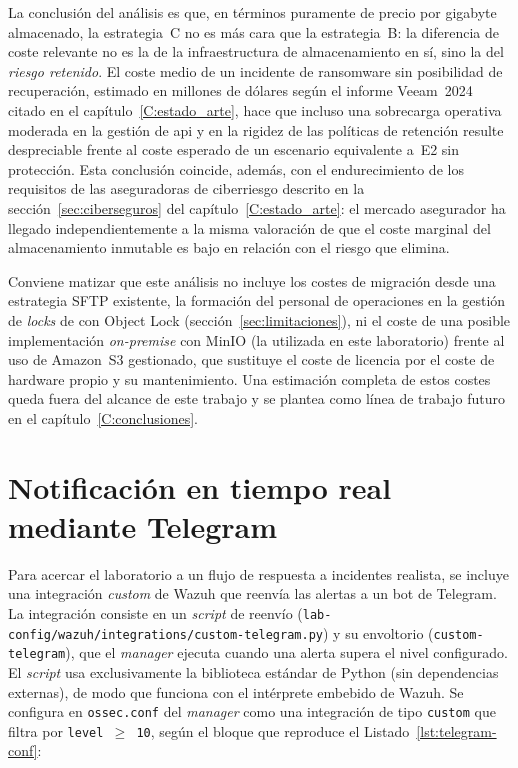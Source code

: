 \documentclass[../main.tex]{subfiles}
\begin{document}
La conclusión del análisis es que, en términos puramente de precio por gigabyte
almacenado, la estrategia~C no es más cara que la estrategia~B: la diferencia de
coste relevante no es la de la infraestructura de almacenamiento en sí, sino la
del \emph{riesgo retenido}. El coste medio de un incidente de ransomware sin
posibilidad de recuperación, estimado en millones de dólares según el informe
Veeam~2024~\cite{veeam2024} citado en el capítulo~\ref{C:estado_arte}, hace que
incluso una sobrecarga operativa moderada en la gestión de \gls{api} y en la
rigidez de las políticas de retención resulte despreciable frente al coste esperado
de un escenario equivalente a~E2 sin protección. Esta conclusión coincide, además,
con el endurecimiento de los requisitos de las aseguradoras de ciberriesgo descrito
en la sección~\ref{sec:ciberseguros} del capítulo~\ref{C:estado_arte}: el mercado
asegurador ha llegado independientemente a la misma valoración de que el coste
marginal del almacenamiento inmutable es bajo en relación con el riesgo que
elimina.

Conviene matizar que este análisis no incluye los costes de migración desde una
estrategia SFTP existente, la formación del personal de operaciones en la
gestión de \emph{locks} de \restic con Object Lock (sección~\ref{sec:limitaciones}),
ni el coste de una posible implementación \emph{on-premise} con MinIO (la
utilizada en este laboratorio) frente al uso de Amazon~S3 gestionado, que
sustituye el coste de licencia por el coste de hardware propio y su
mantenimiento. Una estimación completa de estos costes queda fuera del alcance
de este trabajo y se plantea como línea de trabajo futuro en el
capítulo~\ref{C:conclusiones}.

\section{Notificación en tiempo real mediante Telegram}
\label{sec:telegram}

Para acercar el laboratorio a un flujo de respuesta a incidentes realista, se
incluye una integración \emph{custom} de Wazuh que reenvía las alertas a un bot de
Telegram. La integración consiste en un \emph{script} de reenvío
(\texttt{lab-config/wazuh/integrations/\allowbreak{}custom-telegram.py}) y su
envoltorio (\texttt{custom-telegram}), que el \emph{manager} ejecuta cuando una
alerta supera el nivel configurado. El \emph{script} usa exclusivamente la
biblioteca estándar de Python (sin dependencias externas), de modo que funciona con
el intérprete embebido de Wazuh. Se configura en \texttt{ossec.conf} del
\emph{manager} como una integración de tipo \texttt{custom} que filtra por
\texttt{level~$\geq$~10}, según el bloque que reproduce el
Listado~\ref{lst:telegram-conf}:
\end{document}
